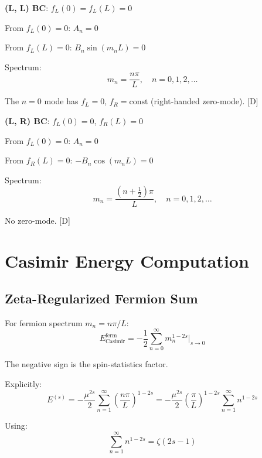 \documentclass[11pt,a4paper]{article}
\newcommand{\tagD}{\textcolor{blue!70!black}{[D]}}
\begin{document}
\textbf{(L, L) BC}: $f_L(0) = f_L(L) = 0$

From $f_L(0) = 0$: $A_n = 0$

From $f_L(L) = 0$: $B_n \sin(m_n L) = 0$

Spectrum:
\begin{equation}
\label{eq:app-LL-spec}
m_n = \frac{n\pi}{L}, \quad n = 0, 1, 2, \ldots
\end{equation}

The $n = 0$ mode has $f_L = 0$, $f_R = \text{const}$ (right-handed zero-mode). \tagD

\textbf{(L, R) BC}: $f_L(0) = 0$, $f_R(L) = 0$

From $f_L(0) = 0$: $A_n = 0$

From $f_R(L) = 0$: $-B_n \cos(m_n L) = 0$

Spectrum:
\begin{equation}
\label{eq:app-LR-spec}
m_n = \frac{(n + \tfrac{1}{2})\pi}{L}, \quad n = 0, 1, 2, \ldots
\end{equation}

No zero-mode. \tagD

\section{Casimir Energy Computation}
\label{app:casimir}

\subsection{Zeta-Regularized Fermion Sum}

For fermion spectrum $m_n = n\pi/L$:
\begin{equation}
\label{eq:app-zeta-ferm}
E_{\text{Casimir}}^{\text{ferm}} = -\frac{1}{2} \sum_{n=0}^\infty m_n^{1-2s}\bigg|_{s \to 0}
\end{equation}

The negative sign is the spin-statistics factor.

Explicitly:
\begin{equation}
\label{eq:app-zeta-explicit}
E^{(s)} = -\frac{\mu^{2s}}{2} \sum_{n=1}^\infty \left(\frac{n\pi}{L}\right)^{1-2s}
= -\frac{\mu^{2s}}{2} \left(\frac{\pi}{L}\right)^{1-2s} \sum_{n=1}^\infty n^{1-2s}
\end{equation}

Using:
\begin{equation}
\label{eq:app-zeta-sum}
\sum_{n=1}^\infty n^{1-2s} = \zeta(2s-1)
\end{equation}
\end{document}
